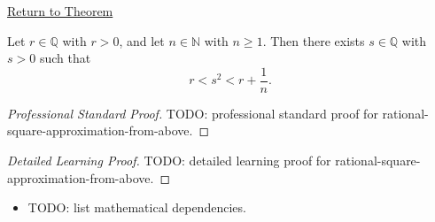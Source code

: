 \newpage
{}
\label{prf:rational-square-approximation-from-above}

\begin{remark*}[Return]
\hyperref[thm:rational-square-approximation-from-above]{Return to Theorem}
\end{remark*}

\begin{theorem*}
Let $r\in\mathbb{Q}$ with $r>0$, and let $n\in\mathbb{N}$ with $n\ge 1$.
Then there exists $s\in\mathbb{Q}$ with $s>0$ such that
\[
r<s^2<r+\frac1n.
\]
\end{theorem*}

\begin{proof}[Professional Standard Proof]
\LRAProofBodyStart
TODO: professional standard proof for rational-square-approximation-from-above.
\end{proof}

\begin{proof}[Detailed Learning Proof]
\LRAProofBodyStart
TODO: detailed learning proof for rational-square-approximation-from-above.
\end{proof}

\begin{remark*}
\end{remark*}

\begin{dependencies}
\begin{itemize}
  \item TODO: list mathematical dependencies.
\end{itemize}
\end{dependencies}

\clearpage
